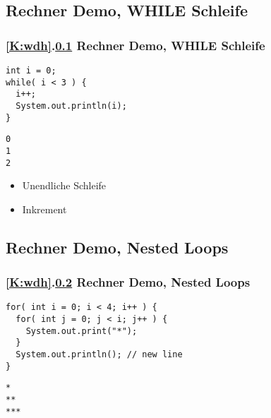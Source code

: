 \def\stitle{Rechner Demo, WHILE Schleife}
\subsection{\stitle}\label{S:RechnerDemo2}
\begin{frame}[fragile]%
  \frametitle{\ref{K:wdh}.\ref{S:RechnerDemo2} \stitle}%


\begin{lstlisting}[title={Beispiel Programm},style=java, frame=single]
int i = 0;
while( i < 3 ) {
  i++;
  System.out.println(i);
}
\end{lstlisting}
\bigskip

\begin{lstlisting}[title=output,style=java, frame=single]
0
1
2
\end{lstlisting}
\hfill

\begin{itemize}
\item Unendliche Schleife
\item Inkrement
\end{itemize}
\end{frame}


\def\stitle{Rechner Demo, Nested Loops}
\subsection{\stitle}\label{S:RechnerDemo3}
\begin{frame}[fragile]%
  \frametitle{\ref{K:wdh}.\ref{S:RechnerDemo3} \stitle}%


\begin{lstlisting}[title={Beispiel Programm},style=java, frame=single]
for( int i = 0; i < 4; i++ ) {
  for( int j = 0; j < i; j++ ) {
    System.out.print("*");
  }
  System.out.println(); // new line
}
\end{lstlisting}
\bigskip
\pause

\begin{lstlisting}[title=output,style=java, frame=single]
*
**
***
\end{lstlisting}
\end{frame}
